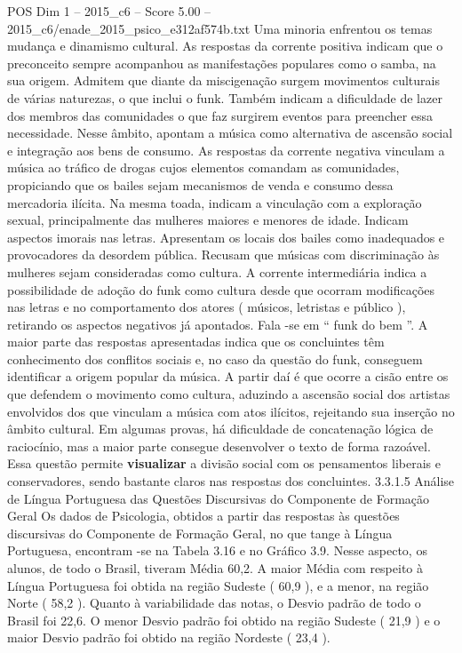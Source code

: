 \begin{textsample}{POS Dim 1 – 2015\_c6 – Score 5.00 – 2015\_c6/enade\_2015\_psico\_e312af574b.txt}
Uma minoria enfrentou os temas mudança e dinamismo cultural.
As respostas da corrente positiva indicam que o preconceito sempre acompanhou as manifestações populares como o samba, na sua origem.
Admitem que diante da miscigenação surgem movimentos culturais de várias naturezas, o que inclui o funk.
Também indicam a dificuldade de lazer dos membros das comunidades o que faz surgirem eventos para preencher essa necessidade.
Nesse âmbito, apontam a música como alternativa de ascensão social e integração aos bens de consumo.
As respostas da corrente negativa vinculam a música ao tráfico de drogas cujos elementos comandam as comunidades, propiciando que os bailes sejam mecanismos de venda e consumo dessa mercadoria ilícita.
Na mesma toada, indicam a vinculação com a exploração sexual, principalmente das mulheres maiores e menores de idade.
Indicam aspectos imorais nas letras.
Apresentam os locais dos bailes como inadequados e provocadores da desordem pública.
Recusam que músicas com discriminação às mulheres sejam consideradas como cultura.
A corrente intermediária indica a possibilidade de adoção do funk como cultura desde que ocorram modificações nas letras e no comportamento dos atores ( músicos, letristas e público ), retirando os aspectos negativos já apontados.
Fala -se em “ funk do bem ”.
A maior parte das respostas apresentadas indica que os concluintes têm conhecimento dos conflitos sociais e, no caso da questão do funk, conseguem identificar a origem popular da música.
A partir daí é que ocorre a cisão entre os que defendem o movimento como cultura, aduzindo a ascensão social dos artistas envolvidos dos que vinculam a música com atos ilícitos, rejeitando sua inserção no âmbito cultural.
Em algumas provas, há dificuldade de concatenação lógica de raciocínio, mas a maior parte consegue desenvolver o texto de forma razoável.
Essa questão permite \textbf{visualizar} a divisão social com os pensamentos liberais e conservadores, sendo bastante claros nas respostas dos concluintes. 3.3.1.5 Análise de Língua Portuguesa das Questões Discursivas do Componente de Formação Geral Os dados de Psicologia, obtidos a partir das respostas às questões discursivas do Componente de Formação Geral, no que tange à Língua Portuguesa, encontram -se na Tabela 3.16 e no Gráfico 3.9.
Nesse aspecto, os alunos, de todo o Brasil, tiveram Média 60,2.
A maior Média com respeito à Língua Portuguesa foi obtida na região Sudeste ( 60,9 ), e a menor, na região Norte ( 58,2 ).
Quanto à variabilidade das notas, o Desvio padrão de todo o Brasil foi 22,6.
O menor Desvio padrão foi obtido na região Sudeste ( 21,9 ) e o maior Desvio padrão foi obtido na região Nordeste ( 23,4 ).

\end{textsample}

